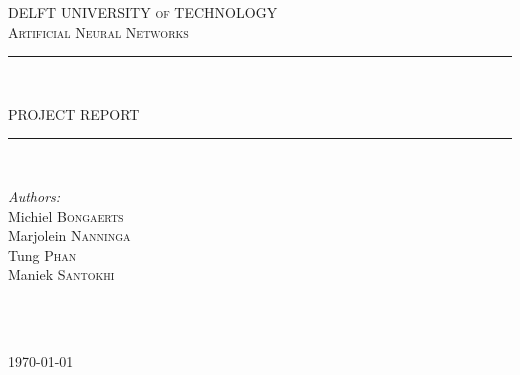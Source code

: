 \documentclass[a4paper,onecolumn]{report}
\begin{document}

\begin{titlepage}


\newcommand{\HRule}{\rule{\linewidth}{0.5mm}}
\newcommand{\horrule}[1]{\rule{\linewidth}{#1}}

\center %

\textsc{\small DELFT UNIVERSITY of TECHNOLOGY}\\[2.5cm] %

\textsc{\LARGE Artificial Neural Networks}\\[0.5cm] %

\HRule \\[0.1cm]
\begin{spacing}{1.6}
{ \huge PROJECT REPORT}\\[-0.4cm] %
\end{spacing}
\HRule \\[1.5cm]

\begin{minipage}{0.4\textwidth}
\begin{flushleft} \large
\emph{Authors:}\\
Michiel \textsc{Bongaerts\\}
Marjolein \textsc{Nanninga}\\
Tung \textsc{Phan}\\
Maniek \textsc{Santokhi}
\end{flushleft}
\end{minipage}
~
\begin{minipage}{0.4\textwidth}
\begin{flushright} \large
\end{flushright}
\end{minipage}\\[4cm]

{\large \today}\\[3cm]

\restoregeometry

\vfill

\end{titlepage}

\end{document}
